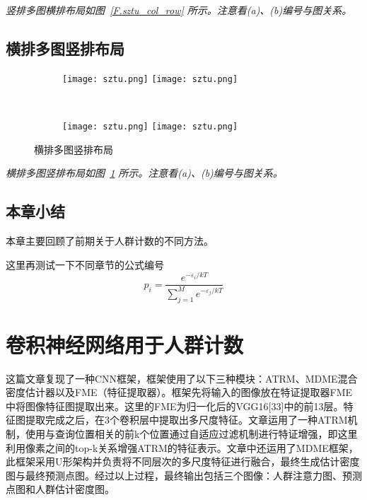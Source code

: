 \emph{竖排多图横排布局如图~\ref{F.sztu_col_row} 所示。注意看(a)、(b)编号与图关系。}


\subsection{横排多图竖排布局}

\lipsum

\begin{figure}[!htb]
    \centering
    \begin{subfigure}[t]{0.3\linewidth}
        \begin{minipage}[b]{1\linewidth}
        \texttt{[image: sztu.png]}
        \texttt{[image: sztu.png]}
        \end{minipage}
        \caption{}
    \end{subfigure}\\
    \begin{subfigure}[t]{0.3\linewidth}
        \begin{minipage}[b]{1\linewidth}
        \texttt{[image: sztu.png]}
        \texttt{[image: sztu.png]}
        \end{minipage}
        \caption{}
    \end{subfigure}
    \caption{横排多图竖排布局}
    \label{F.sztu_row_col}
\end{figure}

\emph{横排多图竖排布局如图~\ref{F.sztu_row_col} 所示。注意看(a)、(b)编号与图关系。}

\subsection{本章小结}
本章主要回顾了前期关于人群计数的不同方法。

这里再测试一下不同章节的公式编号
\begin{equation}
p_{i} = \frac{e^{-\varepsilon_{i}/kT}}{\sum_{j=1}^{M}e^{-\varepsilon_{j}/kT}}
\end{equation}

\newpage    %


\section{卷积神经网络用于人群计数}
这篇文章复现了一种CNN框架，框架使用了以下三种模块：ATRM、MDME混合密度估计器以及FME（特征提取器）。框架先将输入的图像放在特证提取器FME中将图像特征图提取出来。这里的FME为归一化后的VGG16[33]中的前13层。特征图提取完成之后，在3个卷积层中提取出多尺度特征。文章运用了一种ATRM机制，使用与查询位置相关的前k个位置通过自适应过滤机制进行特证增强，即这里利用像素之间的top-k关系增强ATRM的特征表示。文章中还运用了MDME框架，此框架采用U形架构并负责将不同层次的多尺度特征进行融合，最终生成估计密度图与最终预测点图。经过以上过程，最终输出包括三个图像：人群注意力图、预测点图和人群估计密度图。
